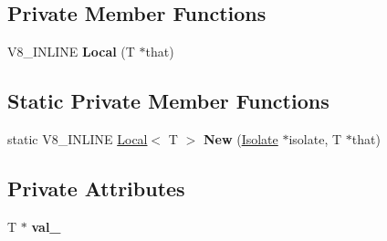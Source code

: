 \subsection*{Private Member Functions}
\begin{DoxyCompactItemize}
\item 
V8\+\_\+\+I\+N\+L\+I\+NE {\bfseries Local} (T $\ast$that)\hypertarget{classv8_1_1_local_a39e260615ef0fbdb29d81af387639010}{}\label{classv8_1_1_local_a39e260615ef0fbdb29d81af387639010}

\end{DoxyCompactItemize}
\subsection*{Static Private Member Functions}
\begin{DoxyCompactItemize}
\item 
static V8\+\_\+\+I\+N\+L\+I\+NE \hyperlink{classv8_1_1_local}{Local}$<$ T $>$ {\bfseries New} (\hyperlink{classv8_1_1_isolate}{Isolate} $\ast$isolate, T $\ast$that)\hypertarget{classv8_1_1_local_a453e50f0a4a117ef4ecb5f3c4bb4f04d}{}\label{classv8_1_1_local_a453e50f0a4a117ef4ecb5f3c4bb4f04d}

\end{DoxyCompactItemize}
\subsection*{Private Attributes}
\begin{DoxyCompactItemize}
\item 
T $\ast$ {\bfseries val\+\_\+}\hypertarget{classv8_1_1_local_a247d60afdd4aff5bd0d225c7ba7d5d04}{}\label{classv8_1_1_local_a247d60afdd4aff5bd0d225c7ba7d5d04}

\end{DoxyCompactItemize}
